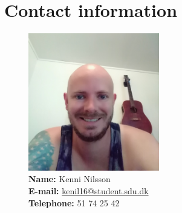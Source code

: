 \documentclass[../Head/Report.tex]{subfiles}
\begin{document}
\section{Contact information}
\begin{figure}[H]
    \centering
    \begin{minipage}{0.27\textwidth}
        \centering
        \includegraphics[height=6cm]{../Figures/Kenni.jpg}
        \caption*{\textbf{Name:} Kenni Nilsson \\ \textbf{E-mail:}  \href{mailto:kenil16@student.sdu.dk}{kenil16@student.sdu.dk} \\ \textbf{Telephone:} 51 74 25 42}
    \end{minipage}
\end{figure}
\end{document}

